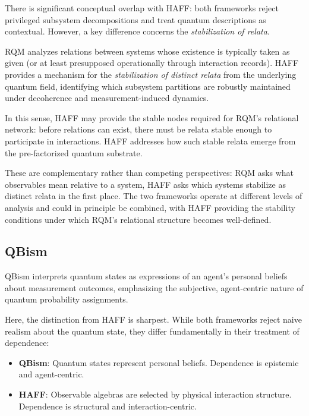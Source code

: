 \documentclass[12pt,a4paper]{article}
\begin{document}
There is significant conceptual overlap with HAFF: both frameworks reject privileged subsystem decompositions and treat quantum descriptions as contextual. However, a key difference concerns the \emph{stabilization of relata}.

RQM analyzes relations between systems whose existence is typically taken as given (or at least presupposed operationally through interaction records). HAFF provides a mechanism for the \emph{stabilization of distinct relata} from the underlying quantum field, identifying which subsystem partitions are robustly maintained under decoherence and measurement-induced dynamics.

In this sense, HAFF may provide the stable nodes required for RQM's relational network: before relations can exist, there must be relata stable enough to participate in interactions. HAFF addresses how such stable relata emerge from the pre-factorized quantum substrate.

These are complementary rather than competing perspectives: RQM asks what observables mean relative to a system, HAFF asks which systems stabilize as distinct relata in the first place. The two frameworks operate at different levels of analysis and could in principle be combined, with HAFF providing the stability conditions under which RQM's relational structure becomes well-defined.

\subsection{QBism}

QBism \cite{Fuchs2014,FuchsMerminSchack2014} interprets quantum states as expressions of an agent's personal beliefs about measurement outcomes, emphasizing the subjective, agent-centric nature of quantum probability assignments.

Here, the distinction from HAFF is sharpest. While both frameworks reject naive realism about the quantum state, they differ fundamentally in their treatment of dependence:

\begin{itemize}
\item \textbf{QBism}: Quantum states represent personal beliefs. Dependence is epistemic and agent-centric.
\item \textbf{HAFF}: Observable algebras are selected by physical interaction structure. Dependence is structural and interaction-centric.
\end{itemize}
\end{document}
